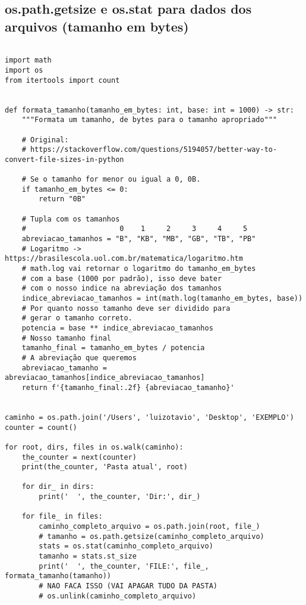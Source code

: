 \documentclass{article}
\begin{document}
\subsection{ os.path.getsize e os.stat para dados dos arquivos (tamanho em bytes)}
\begin{lstlisting}

import math
import os
from itertools import count


def formata_tamanho(tamanho_em_bytes: int, base: int = 1000) -> str:
    """Formata um tamanho, de bytes para o tamanho apropriado"""

    # Original:
    # https://stackoverflow.com/questions/5194057/better-way-to-convert-file-sizes-in-python

    # Se o tamanho for menor ou igual a 0, 0B.
    if tamanho_em_bytes <= 0:
        return "0B"

    # Tupla com os tamanhos
    #                      0    1     2     3     4     5
    abreviacao_tamanhos = "B", "KB", "MB", "GB", "TB", "PB"
    # Logaritmo -> https://brasilescola.uol.com.br/matematica/logaritmo.htm
    # math.log vai retornar o logaritmo do tamanho_em_bytes
    # com a base (1000 por padrão), isso deve bater
    # com o nosso indice na abreviação dos tamanhos
    indice_abreviacao_tamanhos = int(math.log(tamanho_em_bytes, base))
    # Por quanto nosso tamanho deve ser dividido para
    # gerar o tamanho correto.
    potencia = base ** indice_abreviacao_tamanhos
    # Nosso tamanho final
    tamanho_final = tamanho_em_bytes / potencia
    # A abreviação que queremos
    abreviacao_tamanho = abreviacao_tamanhos[indice_abreviacao_tamanhos]
    return f'{tamanho_final:.2f} {abreviacao_tamanho}'


caminho = os.path.join('/Users', 'luizotavio', 'Desktop', 'EXEMPLO')
counter = count()

for root, dirs, files in os.walk(caminho):
    the_counter = next(counter)
    print(the_counter, 'Pasta atual', root)

    for dir_ in dirs:
        print('  ', the_counter, 'Dir:', dir_)

    for file_ in files:
        caminho_completo_arquivo = os.path.join(root, file_)
        # tamanho = os.path.getsize(caminho_completo_arquivo)
        stats = os.stat(caminho_completo_arquivo)
        tamanho = stats.st_size
        print('  ', the_counter, 'FILE:', file_, formata_tamanho(tamanho))
        # NAO FACA ISSO (VAI APAGAR TUDO DA PASTA)
        # os.unlink(caminho_completo_arquivo)
\end{lstlisting}
\end{document}
